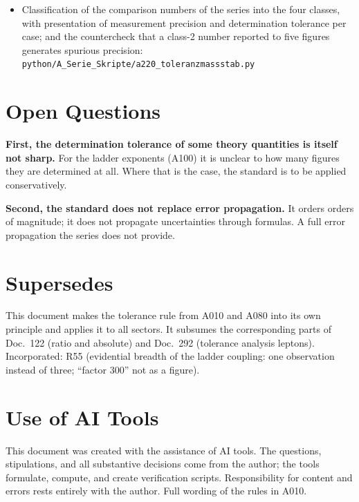 \begin{itemize}
  \item Classification of the comparison numbers of the series into the four
    classes, with presentation of measurement precision and determination
    tolerance per case; and the countercheck that a class-2 number reported to
    five figures generates spurious precision:
    \texttt{python/A\_Serie\_Skripte/a220\_toleranzmassstab.py}
\end{itemize}

\section{Open Questions}

\textbf{First, the determination tolerance of some theory quantities is itself
not sharp.} For the ladder exponents (A100) it is unclear to how many figures
they are determined at all. Where that is the case, the standard is to be applied
conservatively.

\textbf{Second, the standard does not replace error propagation.} It orders orders
of magnitude; it does not propagate uncertainties through formulas. A full error
propagation the series does not provide.

\section{Supersedes}

This document makes the tolerance rule from A010 and A080 into its own principle
and applies it to all sectors. It subsumes the corresponding parts of Doc.~122
(ratio and absolute) and Doc.~292 (tolerance analysis leptons). Incorporated: R55
(evidential breadth of the ladder coupling: one observation instead of three;
``factor 300'' not as a figure).

\section{Use of AI Tools}

This document was created with the assistance of AI tools. The questions,
stipulations, and all substantive decisions come from the author; the tools
formulate, compute, and create verification scripts.
Responsibility for content and errors rests entirely with the author.
Full wording of the rules in A010.
